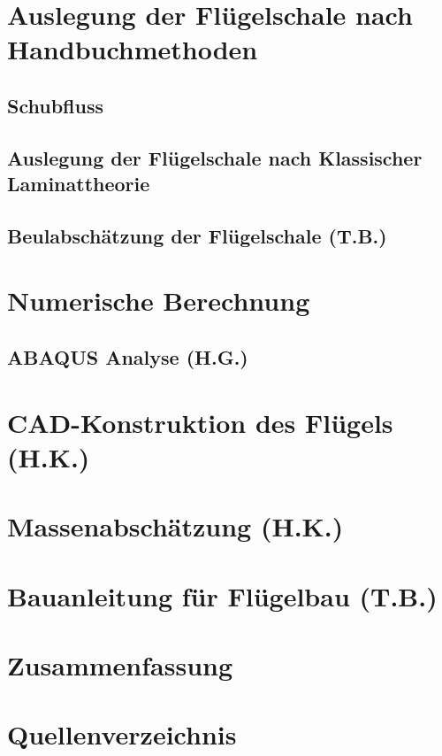 \documentclass[a4paper,twoside,11pt]{article}
\begin{document}
\section{Auslegung der Flügelschale nach Handbuchmethoden}
\subsection{Schubfluss}

\newpage
\subsection{Auslegung der Flügelschale nach Klassischer Laminattheorie}

\newpage
\subsection{Beulabschätzung der Flügelschale (T.B.)}

\newpage
\section{Numerische Berechnung}\label{FEM}

\newpage
\subsection{ABAQUS Analyse (H.G.)}

\newpage
\section{CAD-Konstruktion des Flügels (H.K.)}\label{CAD}

\newpage
\section{Massenabschätzung (H.K.)}

\newpage
\section{Bauanleitung für Flügelbau (T.B.)}

\newpage
\section{Zusammenfassung}

\newpage
\section{Quellenverzeichnis}

\newpage
\end{document}
